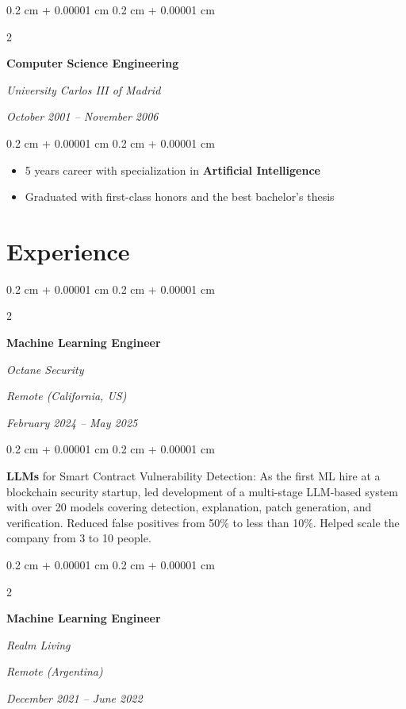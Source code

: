 \documentclass[10pt, letterpaper]{article}
\newenvironment{highlights}{
	\begin{itemize}[
		topsep=0.10 cm,
		parsep=0.10 cm,
		partopsep=0pt,
		itemsep=0pt,
		leftmargin=0.4 cm + 10pt
	]
	}{
	\end{itemize}
} %
\newenvironment{onecolentry}{
	\begin{adjustwidth}{
		0.2 cm + 0.00001 cm
	}{
		0.2 cm + 0.00001 cm
	}
	}{
	\end{adjustwidth}
} %
\newenvironment{twocolentry}[2][]{
	\onecolentry
	\def\secondColumn{#2}
	\setcolumnwidth{\fill, 5.5 cm}
	\begin{paracol}{2}
	}{
		\switchcolumn \raggedleft \secondColumn
	\end{paracol}
	\endonecolentry
} %
\begin{document}
	\vspace{0.2 cm}

	\begin{twocolentry}{
		\textit{October 2001 – November 2006}}
		\textbf{Computer Science Engineering}
		
		\textit{University Carlos III of Madrid}
	\end{twocolentry}

	\vspace{0.10 cm}
	\begin{onecolentry}
		\begin{highlights}
			\item 5 years career with specialization in \textbf{Artificial Intelligence}
			\item Graduated with first-class honors and the best bachelor's thesis
		\end{highlights}
	\end{onecolentry}


	\section{Experience}

	\begin{twocolentry}{
		\textit{Remote (California, US)}
		
		\textit{February 2024 – May 2025}}
		\textbf{Machine Learning Engineer}
		
		\textit{Octane Security}
	\end{twocolentry}

	\vspace{0.10 cm}
	\begin{onecolentry}
		\textbf{LLMs} for Smart Contract Vulnerability Detection: As the first ML hire at a blockchain security startup, led development of a multi-stage LLM-based system with over 20 models covering detection, explanation, patch generation, and verification. Reduced false positives from 50\% to less than 10\%. Helped scale the company from 3 to 10 people.
	\end{onecolentry}

	\vspace{0.2 cm}

	\begin{twocolentry}{
		\textit{Remote (Argentina)}
		
		\textit{December 2021 – June 2022}}
		\textbf{Machine Learning Engineer}
		
		\textit{Realm Living}
	\end{twocolentry}
\end{document}
